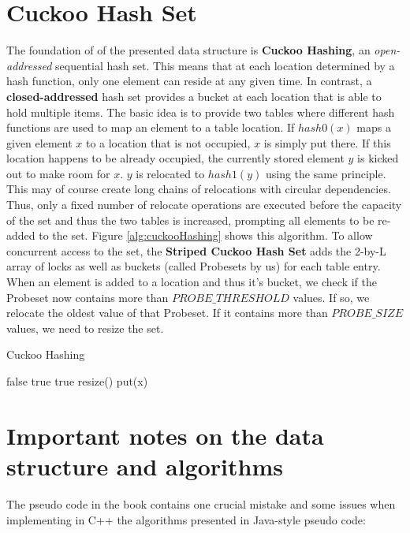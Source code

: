 \documentclass[a4paper,10pt]{article}
\begin{document}
\section{Cuckoo Hash Set}
The foundation of of the presented data structure is \textbf{Cuckoo Hashing}, an \textit{open-addressed} sequential hash set. This means that at each location determined by a hash function, only one element can reside at any given time. In contrast, a \textbf{closed-addressed} hash set provides a bucket at each location that is able to hold multiple items.
\newline
The basic idea is to provide two tables where different hash functions are used to map an element to a table location. If $hash0(x)$ maps a given element $x$ to a location that is not occupied, $x$ is simply put there. If this location happens to be already occupied, the currently stored element $y$ is kicked out to make room for $x$. $y$ is relocated to $hash1(y)$ using the same principle. This may of course create long chains of relocations with circular dependencies. Thus, only a fixed number of relocate operations are executed before the capacity of the set and thus the two tables is increased, prompting all elements to be re-added to the set.
Figure \ref{alg:cuckooHashing} shows this algorithm.
\medskip
\newline
To allow concurrent access to the set, the \textbf{Striped Cuckoo Hash Set} adds the 2-by-L array of locks as well as buckets (called Probesets by us) for each table entry. When an element is added to a location and thus it's bucket, we check if the Probeset now contains more than $PROBE\_THRESHOLD$ values. If so, we relocate the oldest value of that Probeset. If it contains more than $PROBE\_SIZE$ values, we need to resize the set.

\begin{algorithm}
\caption{Cuckoo Hashing}
\label{alg:cuckooHashing}
\begin{algorithmic}[5]
		\State \Return false
	\EndIf
			\State \Return true
			\State \Return true
		\EndIf
	\EndFor
	\State resize()
	\State put(x)
\EndFunction
\end{algorithmic}
\end{algorithm}

\section{Important notes on the data structure and algorithms}
\label{sec:implDetails}
The pseudo code in the book contains one crucial mistake and some issues when implementing in C++ the algorithms presented in Java-style pseudo code:
\end{document}
